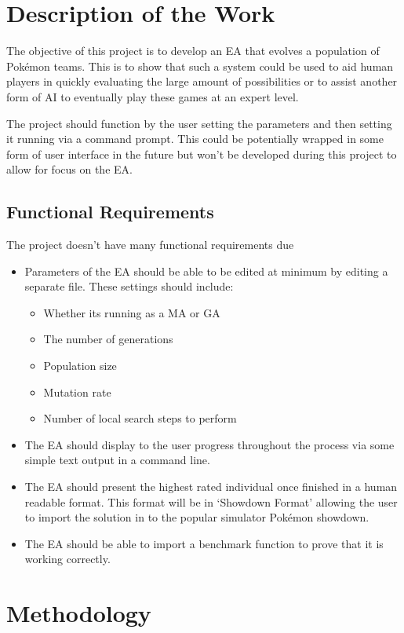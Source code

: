\documentclass[a4paper]{article}
\newcommand{\Pokemon}{Pok\'{e}mon}
\begin{document}
\section{Description of the Work}
\par
The objective of this project is to develop an EA that evolves a population of \Pokemon{} teams.
This is to show that such a system could be used to aid human players in quickly evaluating the large amount of possibilities or to assist another form of AI to eventually play these games at an expert level.
\par
The project should function by the user setting the parameters and then setting it running via a command prompt.
This could be potentially wrapped in some form of user interface in the future but won't be developed during this project to allow for focus on the EA\@.
\subsection{Functional Requirements}
The project doesn't have many functional requirements due
\begin{itemize}
	\item Parameters of the EA should be able to be edited at minimum by editing a separate file. These settings should include:
	\begin{itemize}
		\item Whether its running as a MA or GA
		\item The number of generations
		\item Population size
		\item Mutation rate
		\item Number of local search steps to perform
	\end{itemize}
	\item The EA should display to the user progress throughout the process via some simple text output in a command line.
	\item The EA should present the highest rated individual once finished in a human readable format. This format will be in `Showdown Format' allowing the user to import the solution in to the popular simulator \Pokemon{} showdown.
	\item The EA should be able to import a benchmark function to prove that it is working correctly.
\end{itemize}

\section{Methodology}
\end{document}
